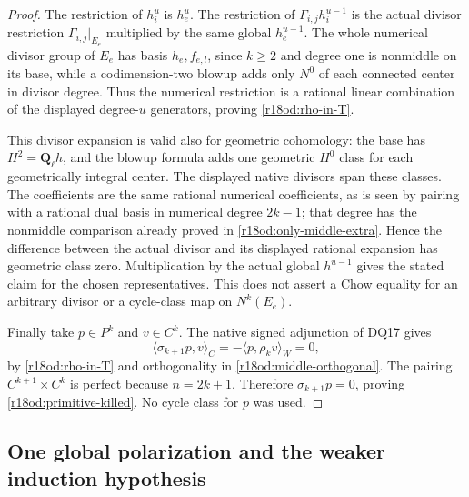 \begin{proof}
The restriction of $h_i^u$ is $h_e^u$.  The restriction of
$\Gamma_{i,j}h_i^{u-1}$ is the actual divisor restriction
$\Gamma_{i,j}|_{E_e}$ multiplied by the same global $h_e^{u-1}$.
The whole numerical divisor group of $E_e$ has basis
$h_e,f_{e,l}$, since $k\ge2$ and degree one is nonmiddle on
its base, while a codimension-two blowup adds only $N^0$ of
each connected center in divisor degree.  Thus the numerical
restriction is a rational linear combination of the displayed
degree-$u$ generators, proving \eqref{r18od:rho-in-T}.

This divisor expansion is valid also for geometric cohomology:
the base has $H^2=\mathbf Q_\ell h$, and the blowup formula
adds one geometric $H^0$ class for each geometrically integral
center.  The displayed native divisors span these classes.
The coefficients are the same rational numerical coefficients,
as is seen by pairing with a rational dual basis in numerical
degree $2k-1$; that degree has the nonmiddle comparison already
proved in \eqref{r18od:only-middle-extra}.  Hence the difference
between the actual divisor and its displayed rational expansion
has geometric class zero.  Multiplication by the actual global
$h^{u-1}$ gives the stated claim for the chosen representatives.
This does not assert a Chow equality for an arbitrary divisor
or a cycle-class map on $N^k(E_e)$.

Finally take $p\in P^k$ and $v\in C^k$.  The native signed
adjunction of DQ17 gives
\[
                  \langle\sigma_{k+1}p,v\rangle_C
                         =-\langle p,\rho_kv\rangle_W=0,
\]
by \eqref{r18od:rho-in-T} and orthogonality in
\eqref{r18od:middle-orthogonal}.  The pairing
$C^{k+1}\times C^k$ is perfect because $n=2k+1$.
Therefore $\sigma_{k+1}p=0$, proving
\eqref{r18od:primitive-killed}.  No cycle class for $p$ was used.
\end{proof}

\subsection{One global polarization and the weaker induction hypothesis}

